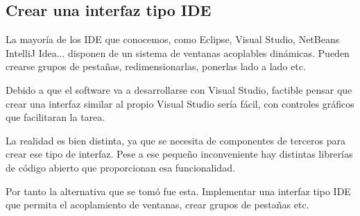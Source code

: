 \subsection{Crear una interfaz tipo IDE}
La mayor\'ia de los IDE que conocemos, como Eclipse, Visual Studio, NetBeans IntelliJ Idea... disponen de un sistema de 
ventanas acoplables din\'amicas. Pueden crearse grupos de pesta\~nas, redimensionarlas, ponerlas lado a lado etc.

Debido a que el software va a desarrollarse con Visual Studio, factible pensar que crear una interfaz similar al propio
Visual Studio ser\'ia f\'acil, con controles gr\'aficos que facilitaran la tarea.

La realidad es bien distinta, ya que se necesita de componentes de terceros para crear ese tipo de interfaz. Pese a ese
peque\~no inconveniente hay distintas librer\'ias de c\'odigo abierto que proporcionan esa funcionalidad.

Por tanto la alternativa que se tom\'o fue esta. Implementar una interfaz tipo IDE que permita el acoplamiento de ventanas,
crear grupos de pesta\~nas etc.